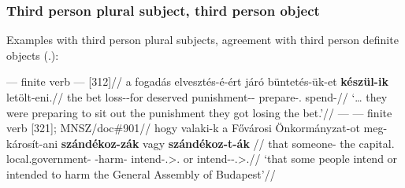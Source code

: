 \subsubsection{Third person plural subject, third person object}\label{sub:3pl-3}

Examples with third person plural subjects, agreement with third person
definite objects (\Tpl.\Obj):

\ex\label{ex:buntetes-keszul}%
    \begingl
        \glpreamble \Obj{} --- finite verb --- \Inf{} [312]//
        \gla 	\nogloss{\dots} a fogadás elvesztés-é-ért járó büntetés-ük-et \textbf{készül-ik} letölt-eni.//
        \glb 	the bet loss-\Tsg-for deserved punishment-\Tpl-\Acc{} prepare-\Tpl.\Obj{} spend-\Inf{}//
        \glft 	\enquote*{\dots{} they were preparing to sit out the punishment they got losing the bet.}\trailingcitation{}//
    \endgl
\xe
\ex\label{ex:szandek-bp}
    \begingl
    \glpreamble \Obj{} --- \Inf{} --- finite verb [321]; \gls{MNSZ}/doc\#901//
        \gla 	\nogloss{\dots{}} hogy valaki-k a Fővárosi Önkormányzat-ot meg-károsít-ani \textbf{szándékoz-zák} vagy \textbf{szándékoz-t-ák} //
        \glb 	that someone-\Pl{} the capital.\Adj{} local.government-\Acc{} \Vm-harm-\Inf{} intend-\Tpl.\Sbj{}>\Third.\Obj{} or intend-\Pst-\Tpl.\Sbj{}>\Third.\Obj{}//
        \glft 	\enquote*{that some people intend or intended to harm the General Assembly of Budapest}//
    \endgl
\xe
